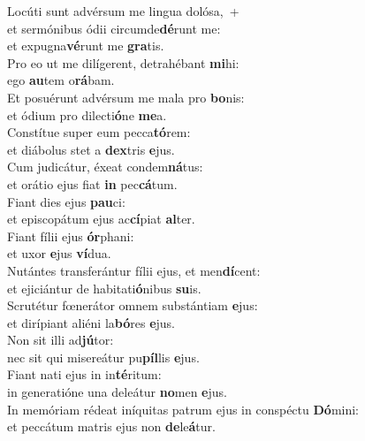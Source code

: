 \evenverse Locúti sunt advérsum me lingua dolósa,~+\\\evenverse  et sermónibus ódii circumde\textbf{dé}runt me:~\*\\
\evenverse et expugna\textbf{vé}runt me \textbf{gra}tis.\\
\oddverse Pro eo ut me dilígerent, detrahébant \textbf{mi}hi:~\*\\
\oddverse ego \textbf{au}tem o\textbf{rá}bam.\\
\evenverse Et posuérunt advérsum me mala pro \textbf{bo}nis:~\*\\
\evenverse et ódium pro dilecti\textbf{ó}ne \textbf{me}a.\\
\oddverse Constítue super eum pecca\textbf{tó}rem:~\*\\
\oddverse et diábolus stet a \textbf{dex}tris \textbf{e}jus.\\
\evenverse Cum judicátur, éxeat condem\textbf{ná}tus:~\*\\
\evenverse et orátio ejus fiat \textbf{in} pec\textbf{cá}tum.\\
\oddverse Fiant dies ejus \textbf{pau}ci:~\*\\
\oddverse et episcopátum ejus ac\textbf{cí}piat \textbf{al}ter.\\
\evenverse Fiant fílii ejus \textbf{ór}phani:~\*\\
\evenverse et uxor \textbf{e}jus \textbf{ví}dua.\\
\oddverse Nutántes transferántur fílii ejus, et men\textbf{dí}cent:~\*\\
\oddverse et ejiciántur de habitati\textbf{ó}nibus \textbf{su}is.\\
\evenverse Scrutétur fœnerátor omnem substántiam \textbf{e}jus:~\*\\
\evenverse et dirípiant aliéni la\textbf{bó}res \textbf{e}jus.\\
\oddverse Non sit illi ad\textbf{jú}tor:~\*\\
\oddverse nec sit qui misereátur pu\textbf{píl}lis \textbf{e}jus.\\
\evenverse Fiant nati ejus in in\textbf{té}ritum:~\*\\
\evenverse in generatióne una deleátur \textbf{no}men \textbf{e}jus.\\
\oddverse In memóriam rédeat iníquitas patrum ejus in conspéctu \textbf{Dó}mini:~\*\\
\oddverse et peccátum matris ejus non \textbf{de}le\textbf{á}tur.\\
